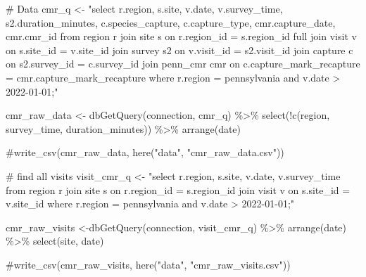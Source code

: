 \documentclass[
  letterpaper,
  DIV=11,
  numbers=noendperiod]{scrartcl}
\newenvironment{Shaded}{\begin{snugshade}}{\end{snugshade}}
\newcommand{\CommentTok}[1]{\textcolor[rgb]{0.37,0.37,0.37}{#1}}
\newcommand{\FunctionTok}[1]{\textcolor[rgb]{0.28,0.35,0.67}{#1}}
\newcommand{\NormalTok}[1]{\textcolor[rgb]{0.00,0.23,0.31}{#1}}
\newcommand{\OtherTok}[1]{\textcolor[rgb]{0.00,0.23,0.31}{#1}}
\newcommand{\SpecialCharTok}[1]{\textcolor[rgb]{0.37,0.37,0.37}{#1}}
\newcommand{\StringTok}[1]{\textcolor[rgb]{0.13,0.47,0.30}{#1}}
\begin{document}
\begin{Shaded}
\begin{Highlighting}[]
\CommentTok{\# Data}
\NormalTok{cmr\_q }\OtherTok{\textless{}{-}} \StringTok{"select r.region, s.site, v.date, v.survey\_time, s2.duration\_minutes, }
\StringTok{          c.species\_capture, c.capture\_type, cmr.capture\_date, cmr.cmr\_id}
\StringTok{          from region r}
\StringTok{          join site s on r.region\_id = s.region\_id }
\StringTok{          full join visit v on s.site\_id = v.site\_id }
\StringTok{          join survey s2 on v.visit\_id = s2.visit\_id }
\StringTok{          join capture c on s2.survey\_id = c.survey\_id}
\StringTok{          join penn\_cmr cmr on c.capture\_mark\_recapture = cmr.capture\_mark\_recapture}
\StringTok{          where r.region = \textquotesingle{}pennsylvania\textquotesingle{}}
\StringTok{          and v.date \textgreater{} \textquotesingle{}2022{-}01{-}01\textquotesingle{};"}

\NormalTok{cmr\_raw\_data }\OtherTok{\textless{}{-}} \FunctionTok{dbGetQuery}\NormalTok{(connection, cmr\_q) }\SpecialCharTok{\%\textgreater{}\%} 
  \FunctionTok{select}\NormalTok{(}\SpecialCharTok{!}\FunctionTok{c}\NormalTok{(region, survey\_time, duration\_minutes)) }\SpecialCharTok{\%\textgreater{}\%} 
  \FunctionTok{arrange}\NormalTok{(date)}

\CommentTok{\#write\_csv(cmr\_raw\_data, here("data", "cmr\_raw\_data.csv"))}

\CommentTok{\# find all visits}
\NormalTok{visit\_cmr\_q }\OtherTok{\textless{}{-}} \StringTok{"select r.region, s.site, v.date, v.survey\_time}
\StringTok{                from region r}
\StringTok{                join site s on r.region\_id = s.region\_id }
\StringTok{                join visit v on s.site\_id = v.site\_id }
\StringTok{                where r.region = \textquotesingle{}pennsylvania\textquotesingle{}}
\StringTok{                and v.date \textgreater{} \textquotesingle{}2022{-}01{-}01\textquotesingle{};"}

\NormalTok{cmr\_raw\_visits }\OtherTok{\textless{}{-}}\FunctionTok{dbGetQuery}\NormalTok{(connection, visit\_cmr\_q) }\SpecialCharTok{\%\textgreater{}\%} 
  \FunctionTok{arrange}\NormalTok{(date) }\SpecialCharTok{\%\textgreater{}\%} 
  \FunctionTok{select}\NormalTok{(site, date)}

\CommentTok{\#write\_csv(cmr\_raw\_visits, here("data", "cmr\_raw\_visits.csv"))}
\end{Highlighting}
\end{Shaded}
\end{document}
